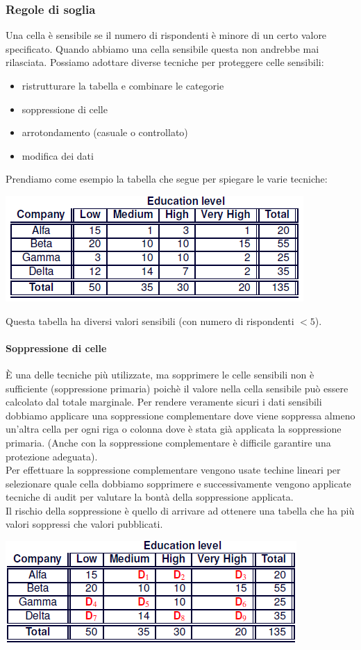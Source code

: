 \subsubsection{Regole di soglia}
Una cella è sensibile se il numero di rispondenti è minore di un certo valore specificato. Quando abbiamo una cella sensibile questa non andrebbe mai rilasciata. Possiamo adottare diverse tecniche per proteggere celle sensibili:
\begin{itemize}
    \item ristrutturare la tabella e combinare le categorie
    \item soppressione di celle
    \item arrotondamento (casuale o controllato)
    \item modifica dei dati
\end{itemize}
Prendiamo come esempio la tabella che segue per spiegare le varie tecniche:
\begin{center}
    \includegraphics[scale=0.6]{img/regsog.png}
\end{center}
Questa tabella ha diversi valori sensibili (con numero di rispondenti \(<5\)).
\paragraph{Soppressione di celle}
È una delle tecniche più utilizzate, ma sopprimere le celle sensibili non è sufficiente (soppressione primaria) poichè il valore nella cella sensibile può essere calcolato dal totale marginale. Per rendere veramente sicuri i dati sensibili dobbiamo applicare una soppressione complementare dove viene soppressa almeno un'altra cella per ogni riga o colonna dove è stata già applicata la soppressione primaria. (Anche con la soppressione complementare è difficile garantire una protezione adeguata).\\
Per effettuare la soppressione complementare vengono usate techine lineari per selezionare quale cella dobbiamo sopprimere e successivamente vengono applicate tecniche di audit per valutare la bontà della soppressione applicata.\\
Il rischio della soppressione è quello di arrivare ad ottenere una tabella che ha più valori soppressi che valori pubblicati.
\begin{center}
    \includegraphics[scale=0.6]{img/supp.png}
\end{center}
